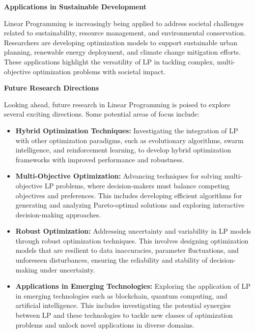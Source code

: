 \documentclass[12pt]{book} %
\begin{document}
\textbf{Applications in Sustainable Development}


Linear Programming is increasingly being applied to address societal challenges related to sustainability, resource management, and environmental conservation. Researchers are developing optimization models to support sustainable urban planning, renewable energy deployment, and climate change mitigation efforts. These applications highlight the versatility of LP in tackling complex, multi-objective optimization problems with societal impact.

\textbf{Future Research Directions}


Looking ahead, future research in Linear Programming is poised to explore several exciting directions. Some potential areas of focus include:

\begin{itemize}
    \item \textbf{Hybrid Optimization Techniques:} Investigating the integration of LP with other optimization paradigms, such as evolutionary algorithms, swarm intelligence, and reinforcement learning, to develop hybrid optimization frameworks with improved performance and robustness.
    
    \item \textbf{Multi-Objective Optimization:} Advancing techniques for solving multi-objective LP problems, where decision-makers must balance competing objectives and preferences. This includes developing efficient algorithms for generating and analyzing Pareto-optimal solutions and exploring interactive decision-making approaches.
    
    \item \textbf{Robust Optimization:} Addressing uncertainty and variability in LP models through robust optimization techniques. This involves designing optimization models that are resilient to data inaccuracies, parameter fluctuations, and unforeseen disturbances, ensuring the reliability and stability of decision-making under uncertainty.
    
    \item \textbf{Applications in Emerging Technologies:} Exploring the application of LP in emerging technologies such as blockchain, quantum computing, and artificial intelligence. This includes investigating the potential synergies between LP and these technologies to tackle new classes of optimization problems and unlock novel applications in diverse domains.
\end{itemize}
\end{document}
